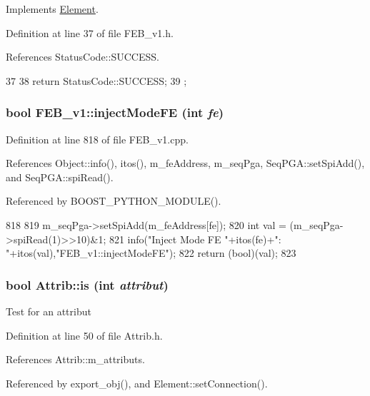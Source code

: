 Implements \hyperlink{classElement_af42754b5cabc198869222725218d695c}{Element}.

Definition at line 37 of file FEB\_\-v1.h.

References StatusCode::SUCCESS.


\begin{DoxyCode}
37                     {
38     return StatusCode::SUCCESS;
39   };
\end{DoxyCode}
\hypertarget{classFEB__v1_adad5a9a1dc8f650a59e6edb310451cab}{
\subsubsection[{injectModeFE}]{\setlength{\rightskip}{0pt plus 5cm}bool FEB\_\-v1::injectModeFE (int {\em fe})}}
\label{classFEB__v1_adad5a9a1dc8f650a59e6edb310451cab}


Definition at line 818 of file FEB\_\-v1.cpp.

References Object::info(), itos(), m\_\-feAddress, m\_\-seqPga, SeqPGA::setSpiAdd(), and SeqPGA::spiRead().

Referenced by BOOST\_\-PYTHON\_\-MODULE().


\begin{DoxyCode}
818                                  {
819   m_seqPga->setSpiAdd(m_feAddress[fe]);
820   int val = (m_seqPga->spiRead(1)>>10)&1;
821   info("Inject Mode FE "+itos(fe)+": "+itos(val),"FEB_v1::injectModeFE");
822   return (bool)(val);
823 }
\end{DoxyCode}
\hypertarget{classAttrib_a704f26af560909ad22065083bb7d4c34}{
\subsubsection[{is}]{\setlength{\rightskip}{0pt plus 5cm}bool Attrib::is (int {\em attribut})}}
\label{classAttrib_a704f26af560909ad22065083bb7d4c34}
Test for an attribut 

Definition at line 50 of file Attrib.h.

References Attrib::m\_\-attributs.

Referenced by export\_\-obj(), and Element::setConnection().


